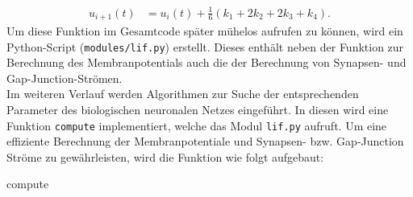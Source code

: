 	\begin{align}
		\label{eq:runkgekutta_erg}
		u_{i+1}(t) &= u_i(t) + \tfrac{1}{6} (k_1 + 2 k_2 + 2 k_3 + k_4).
	\end{align}
	Um diese Funktion im Gesamtcode später mühelos aufrufen zu können, wird ein Python-Script (\texttt{modules/lif.py}) erstellt. Dieses enthält neben der Funktion zur Berechnung des Membranpotentials auch die der Berechnung von Synapsen- und Gap-Junction-Strömen.\\
	Im weiteren Verlauf werden Algorithmen zur Suche der entsprechenden Parameter des biologischen neuronalen Netzes eingeführt. In diesen wird eine Funktion \texttt{compute} implementiert, welche das Modul \texttt{lif.py} aufruft. Um eine effiziente Berechnung der Membranpotentiale und Synapsen- bzw. Gap-Junction Ströme zu gewährleisten, wird die Funktion wie folgt aufgebaut:
	\begin{algorithm}
		
		
		\caption{compute}
	\end{algorithm}\\
